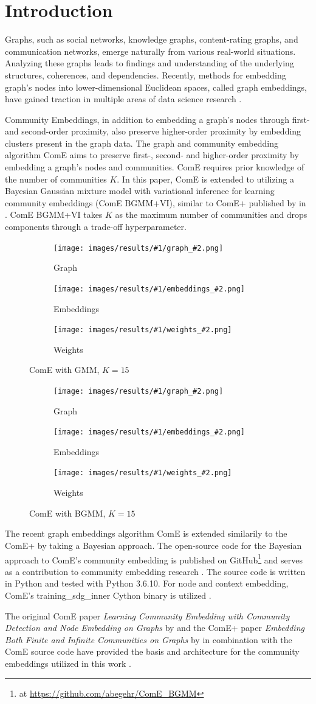 \documentclass[conference]{IEEEtran}
\newcommand{\visresults}[2]{
    \begin{figure}[H]
        \centering
        \begin{subfigure}{.15\textwidth}
            \centering
            \texttt{[image: images/results/\#1/graph\_\#2.png]}
            \caption{Graph}
        \end{subfigure}%
        \begin{subfigure}{.15\textwidth}
            \centering
            \texttt{[image: images/results/\#1/embeddings\_\#2.png]}
            \caption{Embeddings}
        \end{subfigure}%
        \begin{subfigure}{.15\textwidth}
            \centering
            \texttt{[image: images/results/\#1/weights\_\#2.png]}
            \caption{Weights}
        \end{subfigure}%
        \caption{ComE with #1, $K=#2$}
        \label{fig:results#1#2}
    \end{figure}
}
\begin{document}
\section{Introduction}

Graphs, such as social networks, knowledge graphs, content-rating graphs, and communication networks, emerge naturally from various real-world situations. Analyzing these graphs leads to findings and understanding of the underlying structures, coherences, and dependencies. Recently, methods for embedding graph's nodes into lower-dimensional Euclidean spaces, called graph embeddings, have gained traction in multiple areas of data science research \cite{Goyal_2018}.

Community Embeddings, in addition to embedding a graph's nodes through first- and second-order proximity, also preserve higher-order proximity by embedding clusters present in the graph data. The graph and community embedding algorithm ComE aims to preserve first-, second- and higher-order proximity by embedding a graph's nodes and communities\cite{ComE}. ComE requires prior knowledge of the number of communities $K$. In this paper, ComE is extended to utilizing a Bayesian Gaussian mixture model with variational inference for learning community embeddings (ComE BGMM+VI), similar to ComE+ published by \citeauthor{ComE+} in \citeyear{ComE+} \cite{ComE+}. ComE BGMM+VI takes $K$ as the maximum number of communities and drops components through a trade-off hyperparameter.

\visresults{GMM}{15}
\visresults{BGMM}{15}

The recent \citeyear{ComE} graph embeddings algorithm ComE is extended similarily to the \citeyear{ComE+} ComE+ by taking a Bayesian approach. The open-source code for the Bayesian approach to ComE's community embedding is published on GitHub\footnote{at \url{https://github.com/abegehr/ComE_BGMM}} and serves as a contribution to community embedding research \cite{ComE_BGMM_GH}. The source code is written in Python and tested with Python 3.6.10. For node and context embedding, ComE's training\_sdg\_inner Cython binary is utilized \cite{van1995python, ComE_GH}.

The original ComE paper \textit{Learning Community Embedding with Community Detection and Node Embedding on Graphs} by \citeauthor{ComE} and the ComE+ paper \textit{Embedding Both Finite and Infinite Communities on Graphs} by \citeauthor{ComE+} in combination with the ComE source code have provided the basis and architecture for the community embeddings utilized in this work \cite{ComE, ComE+, ComE_GH}.
\end{document}
